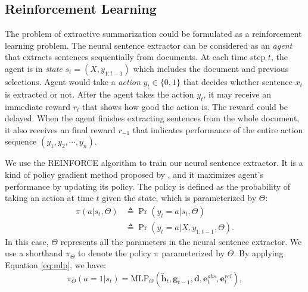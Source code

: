 \documentclass[letterpaper]{article} %
\begin{document}
	\subsection{Reinforcement Learning}
	The problem of extractive summarization could be formulated as a reinforcement learning problem. The neural sentence extractor can be considered as an \emph{agent} that extracts sentences sequentially from documents. At each time step $t$, the agent is in \emph{state} $s_t = (X, y_{1:t-1})$ which includes the document and previous selections. Agent would take a \emph{action} $y_t \in \{0,1\}$ that decides whether sentence $x_t$ is extracted or not. After the agent takes the action $y_t$, it may receive an immediate reward $r_{t}$ that shows how good the action is. The reward could be delayed. When the agent finishes extracting sentences from the whole document, it also receives an final reward $r_{-1}$ that indicates performance of the entire action sequence $(y_1, y_2, \cdots, y_n)$.
	
	We use the REINFORCE algorithm to train our neural sentence extractor. It is a kind of policy gradient method proposed by \cite{williams_simple_1992}, and it maximizes agent's performance by updating its policy. The policy is defined as the probability of taking an action at time $t$ given the state, which is parameterized by $\Theta$:
	\begin{align}
	\pi(a|s_t,\Theta) &\triangleq \Pr(y_t=a|s_t,\Theta) \\
	&\triangleq \Pr(y_t=a|X, y_{1:t-1}, \Theta) .
	\end{align}
	In this case, $\Theta$ represents all the parameters in the neural sentence extractor. We use a shorthand $\pi_{\Theta}$ to denote the policy $\pi$ parameterized by $\Theta$. By applying Equation \ref{eq:mlp}, we have:
	\begin{equation}
	\pi_{\Theta}(a=1|s_t) = \text{MLP}_{\Theta}(\overleftrightarrow{\mathbf{h}}_t, \mathbf{g}_{t-1}, \mathbf{d}, \mathbf{e}_t^{abs}, \mathbf{e}_t^{rel} ) ,
	\end{equation}
	
\end{document}
